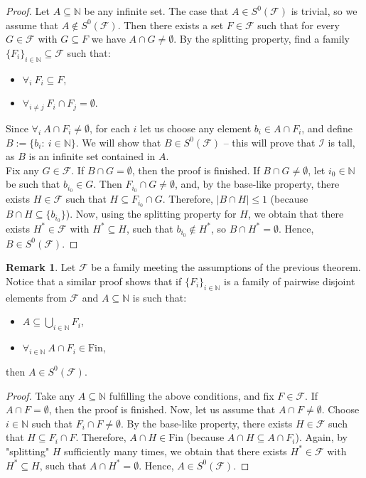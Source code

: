 \documentclass{amsart}
\theoremstyle{definition}
\newtheorem{remark}[thm]{Remark}
\newcommand{\N}{{\mathbb N}}
\newcommand{\Fin}{\textrm{Fin}}
\newcommand{\I}{\mathcal I}
\newcommand{\MB}{S^0}
\begin{document}
\begin{proof}
Let $A \subseteq\N$ be any infinite set. 
The case that $A\in \MB(\mathcal{F})$ is trivial, 
so we assume that $A\notin \MB(\mathcal{F})$. Then there exists a set $F\in\mathcal{F}$ such that for every $G\in\mathcal{F}$ with $G\subseteq F$ we have $A\cap G \neq\emptyset$. By the splitting property, find a family $\{F_i\}_{i\in\N} \subseteq\mathcal{F}$ such that:
\begin{itemize}
\item $\forall_{i}\ F_i \subseteq F$,
\item $\forall_{i\neq j}\ F_i\cap F_j =\emptyset$.
\end{itemize}
Since $\forall_{i}\ A\cap F_i \neq\emptyset$, for each $i$ let us choose any element $b_i \in A\cap F_i$, and define $B:=\{b_i :\ i\in\N\}$. We will show that $B\in\MB(\mathcal{F})$ -- this will prove that $\I$ is tall, as $B$ is an infinite set contained in $A$.\\
Fix any $G\in \mathcal{F}$. If $B\cap G=\emptyset$, then the proof is finished. If $B\cap G \neq\emptyset$, let $i_0\in\N$ be such that $b_{i_0}\in G$. Then $F_{i_0}\cap G \neq\emptyset$, and, by the base-like property, there exists $H\in\mathcal{F}$ such that $H\subseteq F_{i_0}\cap G$. Therefore, $|B\cap H|\leq 1$ (because $B\cap H\subseteq\{b_{i_0}\}$). Now, using the splitting property for $H$, we obtain that there exists $H^*\in\mathcal{F}$ with $H^*\subseteq H$, such that $b_{i_0}\notin H^*$, so $B\cap H^* =\emptyset$. Hence, $B\in\MB(\mathcal{F})$.
\end{proof}

\begin{remark}\label{remtall+}
Let $\mathcal{F}$ be a family meeting the assumptions of the previous theorem.
Notice that a similar proof shows that if $\{F_i\}_{i\in\N}$ is a family of pairwise disjoint elements from $\mathcal{F}$ and $A\subseteq \N$ is such that:
\begin{itemize}
	\item $A\subseteq \bigcup_{i\in\N}{F_i}$,
	\item $\forall_{i\in\N}\ A\cap F_i\in\Fin$,
\end{itemize}
then $A\in\MB(\mathcal{F})$.
\end{remark}

\begin{proof}
Take any $A\subseteq\N$ fulfilling the above conditions, and fix $F\in\mathcal{F}$. If $A\cap F=\emptyset$, then the proof is finished. Now, let us assume that $A\cap F \neq\emptyset$. Choose $i\in\N$ such that $F_i\cap F \neq\emptyset$. By the base-like property, there exists $H\in\mathcal{F}$ such that $H\subseteq F_i\cap F$. Therefore, $A\cap H\in\Fin$ (because $A\cap H\subseteq A\cap F_i$). Again, by "splitting" $H$ sufficiently many times, we obtain that there exists $H^*\in\mathcal{F}$ with $H^*\subseteq H$, such that $A\cap H^* =\emptyset$. Hence, $A\in\MB(\mathcal{F})$.
\end{proof}
\end{document}

